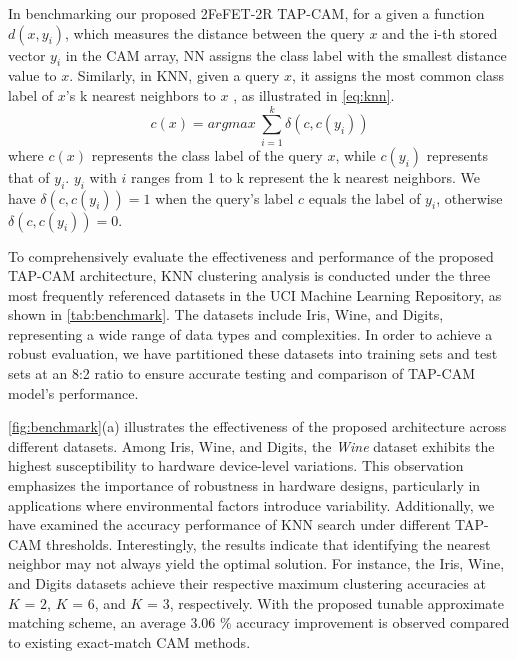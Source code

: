 In benchmarking our proposed 2FeFET-2R TAP-CAM, for a given a function $d(x,y_i)$, which measures the distance between the query $x$ and the i-th stored vector $y_i$ in the CAM array, NN assigns the class label with the smallest distance value to $x$. Similarly, in KNN, given a query $x$, it assigns the most common class label of $x$'s k nearest neighbors to $x$ \cite{jiang2007survey}, as illustrated in \autoref{eq:knn}.
\begin{equation}
\label{eq:knn}
    c(x) = argmax\ \sum^k_{i=1} \delta(c,c(y_i))
\end{equation}
where $c(x)$ represents the class label of the query $x$, while $c(y_i)$ represents that of $y_i$. $y_i$ with $i$ ranges from 1 to k represent the k nearest neighbors. We have $\delta(c,c(y_i))=1$ when the query's label $c$ equals the label of $y_i$, otherwise $\delta(c,c(y_i))=0$.


To comprehensively evaluate the effectiveness and performance of the proposed TAP-CAM architecture, KNN clustering analysis is conducted under the three most frequently referenced datasets in the UCI Machine Learning Repository, as shown in \autoref{tab:benchmark}. The datasets include Iris, Wine, and Digits, representing a wide range of data types and complexities. In order to achieve a robust evaluation, we have partitioned these datasets into training sets and test sets at an 8:2 ratio to ensure accurate testing and comparison of TAP-CAM model's performance.


\autoref{fig:benchmark}(a) illustrates the effectiveness of the proposed \design architecture across different datasets. 
Among Iris, Wine, and Digits, the \textit{Wine} dataset exhibits the highest susceptibility to hardware device-level variations. This observation emphasizes the importance of robustness in hardware designs, particularly in applications where environmental factors introduce variability. Additionally, we have examined the accuracy performance of KNN search under different TAP-CAM thresholds. 
Interestingly, the results indicate that identifying the nearest neighbor may not always yield the optimal solution. 
For instance, the Iris, Wine, and Digits datasets achieve their respective maximum clustering accuracies at $\textit{K = }2$, $\textit{K = }6$, and $\textit{K = }3$, respectively. 
With the proposed tunable approximate matching scheme, an average 3.06 \% accuracy improvement is observed compared to existing exact-match CAM methods.


